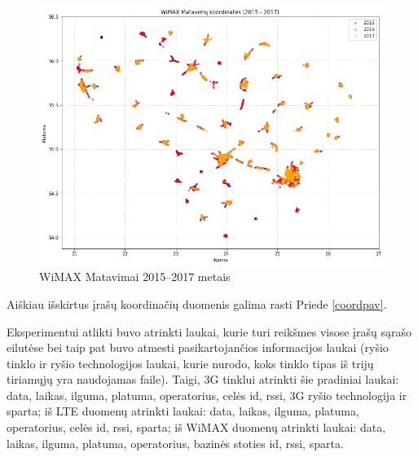 \documentclass{VUMIFPSbakalaurinis}
\begin{document}
\begin{figure}[H]
	\centering
	\includegraphics[scale=0.5]{img/WiMAX-0}
	\caption{WiMAX Matavimai 2015–2017 metais}
	\label{img:WiMAX-0}
\end{figure}
Aiškiau išskirtus įrašų koordinačių duomenis galima rasti Priede \ref{coordpav}.


 \label{subsubsubsec:paruošimas1}
Eksperimentui atlikti buvo atrinkti laukai, kurie turi reikšmes visose įrašų sąrašo eilutėse bei taip pat buvo atmesti pasikartojančios informacijos laukai (ryšio tinklo ir ryšio technologijos laukai, kurie nurodo, koks tinklo tipas iš trijų tiriamųjų yra naudojamas faile). Taigi, 3G tinklui atrinkti šie pradiniai laukai: data, laikas, ilguma, platuma, operatorius, celės id, rssi, 3G ryšio technologija ir sparta; iš LTE duomenų atrinkti laukai: data, laikas, ilguma, platuma, operatorius, celės id, rssi, sparta; iš WiMAX duomenų atrinkti laukai: data, laikas, ilguma, platuma, operatorius, bazinės stoties id, rssi, sparta.\par
\end{document}
